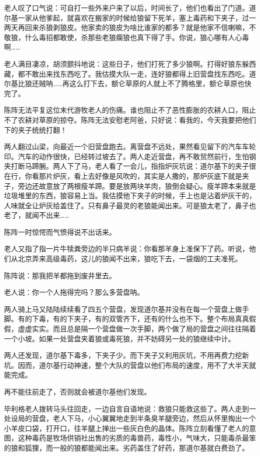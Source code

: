 \par 老人叹了口气说：可自打一些外来户来了以后，时间长了，他们也看出了门道。道尔基一家从他爹起，就喜欢在搬家的时候给狼留下死羊，塞上毒药和下夹子，过一两天再回来杀狼剥狼皮。他家卖的狼皮为啥比谁家的都多？就是他家不信喇嘛，不敬狼，什么毒招都敢使，杀那些老狼瘸狼也真下得了手。你说，狼心哪有人心毒啊……
\par 老人满目凄凉，胡须颤抖地说：这些日子，他们打死了多少狼啊。打得好狼东躲西藏，都不敢出来找东西吃了。我估摸大队一走，连好狼都得上旧营盘找东西吃。道尔基比狼还贼呐……再这么打下去，额仑草原的人就上不了腾格里，额仑草原也快完了。
\par 陈阵无法平复这位末代游牧老人的伤痛。谁也阻止不了恶性膨胀的农耕人口，阻止不了农耕对草原的掠夺。陈阵无法安慰老阿爸，只好说：看我的，今天我要把他们下的夹子统统打翻！
\par 两人翻过山梁，向最近一个旧营盘跑去。离营盘不远处，果然看见留下的汽车车轮印。汽车的动作很快，已经转过坡去了。两人走近营盘，再不敢贸然前行，生怕钢夹打断马蹄腕。两人下了马，老人看了一会儿，指指炉灰坑说：道尔基下的夹子很在行，你看那片炉灰，看上去好像是风吹的，其实是人撒的，那炉灰底下就是夹子，旁边还故意放了两根瘦羊蹄。要是放两块羊肉，狼倒会疑心。瘦羊蹄本来就是垃圾堆里的东西，狼容易上当。我估摸他下夹子的时候，手上也是沾着炉灰干的，人味就全让炉灰给盖住了。只有鼻子最灵的老狼能闻出来。可是狼太老了，鼻子也老了，就闻不出来……
\par 陈阵一时惊愕而气愤得说不出话来。
\par 老人又指了指一片牛犊粪旁边的半只病羊说：你看那羊身上准保下了药。听说，他们从北京弄来高级毒药，这儿的狼闻不出来，狼吃下去，一袋烟的工夫准死。
\par 陈阵说：那我把羊都拖到废井里去。
\par 老人说：你一个人拖得完吗？那么多营盘呐。
\par 两人骑上马又陆陆续续看了四五个营盘，发现道尔基并没有在每一个营盘上做手脚。有的下毒，有的下夹子，有的双管齐下，还有的什么也不下。整个布局真真假假，虚虚实实。而且总是隔一个营盘做一次手脚，两个做了局的营盘之间往往隔着一个小坡。如果一处营盘夹着狼或毒死狼，并不妨碍另一处的狼继续中计。
\par 两人还发现，道尔基下毒多，下夹子少。而下夹子又利用灰坑，不用再费力挖新坑。因而，道尔基行动神速，整个大队的营盘以他们布局的速度，用不了大半天就能完成。
\par 再不能往前走了，否则就会被道尔基他们发现。
\par 毕利格老人拨转马头往回走，一边自言自语地说：救狼只能救这些了。两人走到一处设局的营盘，老人下马，小心翼翼地走到半条臭羊腿旁边，然后从怀里掏出一个小羊皮口袋，打开口，往羊腿上掸出一些灰白色的晶体。陈阵立刻看懂了老人的意图，这种毒药是牧场供销社出售的劣质的毒兽药，毒性小，气味大，只能毒杀最笨的狼和狐狸，而一般的狼都能闻出来。劣药盖住了好药，那道尔基就白费劲了。
